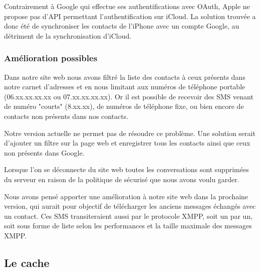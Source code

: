 Contrairement à Google qui effectue ses authentifications avec OAuth, Apple ne propose pas d'API permettant l'authentification sur iCloud.
La solution trouvée a donc été de synchroniser les contacts de l'iPhone avec un compte Google, au détriment de la synchronisation d'iCloud.


\subsubsection{Amélioration possibles}


Dans notre site web nous avons filtré la liste des contacts à ceux présents dans notre carnet d'adresses et en nous limitant aux numéros de téléphone portable (06.xx.xx.xx.xx ou 07.xx.xx.xx.xx).
Or il est possible de recevoir des SMS venant de numéro "courts" (8.xx.xx), de numéros de téléphone fixe, ou bien encore de contacts non présents dans nos contacts.

Notre version actuelle ne permet pas de résoudre ce problème.
Une solution serait d'ajouter un filtre sur la page web et enregistrer tous les contacts ainsi que ceux non présents dans Google.



Lorsque l'on se déconnecte du site web toutes les conversations sont supprimées du serveur en raison de la politique de sécurisé que nous avons voulu garder.

Nous avons pensé apporter une amélioration à notre site web dans la prochaine version, qui aurait pour objectif de télécharger les anciens messages échangés avec un contact.
Ces SMS transiteraient aussi par le protocole XMPP, soit un par un, soit sous forme de liste selon les performances et la taille maximale des messages XMPP.




\subsection{Le cache}

